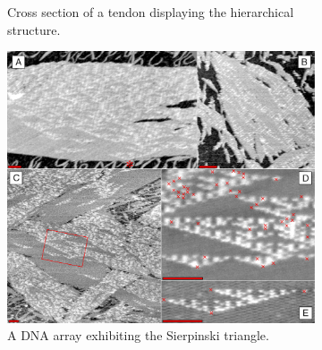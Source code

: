 \begin{figure}
\begin{subfigure}{.40\linewidth}
  \caption{Cross section of a tendon displaying the hierarchical structure.}
  \label{fig:material_examples:tendon}
\end{subfigure}\hfill
\begin{subfigure}{.30\linewidth}\centering
  \includegraphics[width=\linewidth]{img/Rothemund-DNA-SierpinskiGasket}
  \caption{A DNA array exhibiting the Sierpinski triangle.}
  \label{fig:material_examples:sierpinski}
\end{subfigure}
\caption{}\label{fig:material_examples}
\end{figure}


